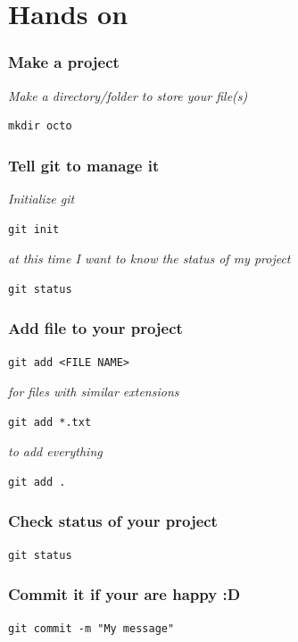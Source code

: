 \documentclass[bigger, presentation]{beamer}
\begin{document}
\section{Hands on}
\label{sec-5}
\begin{frame}[fragile]
\frametitle{Make a project}
\label{sec-5-1}

   \emph{Make a directory/folder to store your file(s)}
     

\begin{verbatim}
mkdir octo
\end{verbatim}
\end{frame}
\begin{frame}[fragile]
\frametitle{Tell git to manage it}
\label{sec-5-2}


   \emph{Initialize git}


\begin{verbatim}
git init
\end{verbatim}

   
   \emph{at this time I want to know the status of my project}


\begin{verbatim}
git status
\end{verbatim}
\end{frame}
\begin{frame}[fragile]
\frametitle{Add file to your project}
\label{sec-5-3}


\begin{verbatim}
git add <FILE NAME>
\end{verbatim}

   \emph{for files with similar extensions}

\begin{verbatim}
git add *.txt
\end{verbatim}

   \emph{to add everything}

\begin{verbatim}
git add .
\end{verbatim}
\end{frame}
\begin{frame}[fragile]
\frametitle{Check status of your project}
\label{sec-5-4}



\begin{verbatim}
git status
\end{verbatim}
\end{frame}
\begin{frame}[fragile]
\frametitle{Commit it if your are happy :D}
\label{sec-5-5}



\begin{verbatim}
git commit -m "My message"
\end{verbatim}
\end{frame}
\end{document}
